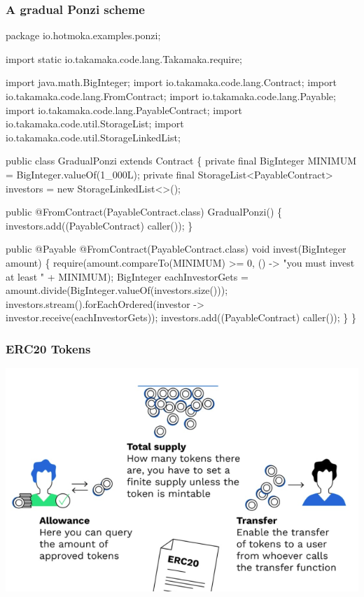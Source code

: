 \documentclass[11pt]{beamer}  %
\begin{document}
\begin{frame}[fragile]\frametitle{A gradual Ponzi scheme}

{\tiny\begin{semiverbatim}
package io.hotmoka.examples.ponzi;

import static io.takamaka.code.lang.Takamaka.require;

import java.math.BigInteger;
import io.takamaka.code.lang.Contract;
import io.takamaka.code.lang.FromContract;
import io.takamaka.code.lang.Payable;
import io.takamaka.code.lang.PayableContract;
import io.takamaka.code.util.StorageList;
import io.takamaka.code.util.StorageLinkedList;

public class GradualPonzi extends Contract \{
  private final BigInteger MINIMUM = BigInteger.valueOf(1_000L);
  private final {\color{red}StorageList<PayableContract> investors = new StorageLinkedList<>();}

  public {\color{violet}@FromContract(PayableContract.class)} GradualPonzi() \{
    investors.add({\color{violet}(PayableContract) caller()});
  \}

  public {\color{airforceblue}@Payable} {\color{violet}@FromContract(PayableContract.class)} void invest({\color{airforceblue}BigInteger amount}) \{
    require(amount.compareTo(MINIMUM) >= 0, () -> "you must invest at least " + MINIMUM);
    BigInteger eachInvestorGets = amount.divide(BigInteger.valueOf(investors.size()));
    investors.stream().forEachOrdered(investor -> investor.receive(eachInvestorGets));
    investors.add({\color{violet}(PayableContract) caller()});
  \}
\}
\end{semiverbatim}}

\end{frame}

\begin{frame}\frametitle{ERC20 Tokens}

  \begin{center}
    \includegraphics[scale=0.4,clip=false]{pictures/erc20_1.png}
  \end{center}
  
\end{frame}
\end{document}
